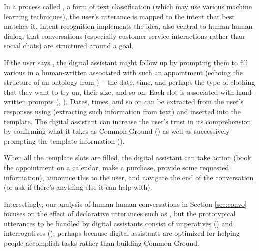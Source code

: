 In a process called , a form of text classification (which may use various machine learning techniques), the user's utterance is mapped to the intent that best matches it.  Intent recognition implements the idea, also central to human-human dialog, that conversations (especially customer-service interactions rather than social chats) are structured around a goal.  

If the user says , the digital assistant might follow up by prompting them to fill various  in a human-written  associated with such an appointment (echoing the structure of an ontology from ) -- the date, time, and perhaps the type of clothing that they want to try on, their size, and so on.  Each slot is associated with hand-written prompts (, ).  Dates, times, and so on can be extracted from the user's responses using  (extracting such information from text) and inserted into the template.  The digital assistant can increase the user's trust in its comprehension by confirming what it takes as Common Ground () as well as successively prompting the template information ().   


When all the template slots are filled, the digital assistant can take action (book the appointment on a calendar, make a purchase, provide some requested information), announce this to the user, and navigate the end of the conversation (or ask if there's anything else it can help with).

Interestingly, our analysis of human-human conversations in Section \ref{sec:convo} focuses on the effect of declarative utterances such as , but the prototypical utterances to be handled by digital assistants consist of imperatives () and interrogatives (), perhaps because digital assistants are optimized for helping people accomplish tasks rather than building Common Ground.


